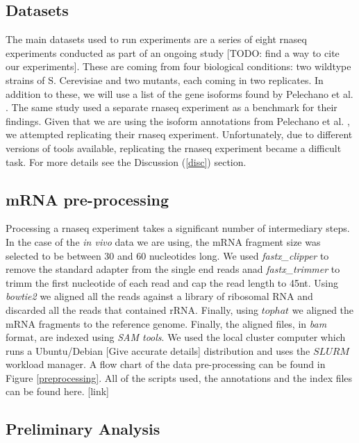 \documentclass[12pt]{article}
\begin{document}
\subsection{Datasets}\label{datasets}

The main datasets used to run experiments are a series of eight \acrshort{rnaseq} experiments conducted as part of an ongoing study {\tiny[TODO: find a way to cite our experiments]}. These are coming from four biological conditions: two wildtype strains of S. Cerevisiae and two mutants, each coming in two replicates. In addition to these, we will use a list of the gene isoforms found by Pelechano et al. \cite{Pelechano2013}. The same study \cite{Pelechano2013} used a separate \cite{Wilkening2013}  \acrshort{rnaseq} experiment as a benchmark for their findings. Given that we are using the isoform annotations from Pelechano et al. \cite{Pelechano2013}, we attempted replicating their \acrshort{rnaseq} experiment. Unfortunately, due to different versions of tools available, replicating the \acrshort{rnaseq} experiment became a difficult task. For more details see the Discussion (\ref{disc}) section. 

\subsection{mRNA pre-processing}
Processing a \acrshort{rnaseq} experiment takes a significant number of intermediary steps. In the case of the \textit{in vivo} data we are using, the mRNA fragment size was selected to be between 30 and 60 nucleotides long. We used \textit{fastx\_clipper} to remove the standard adapter from the single end reads anad \textit{fastx\_trimmer}  to trimm the first nucleotide of each read and cap the read length to 45nt. Using \textit{bowtie2} we aligned all the reads against a library of ribosomal RNA and discarded all the reads that  contained rRNA. Finally, using $tophat$ we aligned the mRNA fragments to the reference genome. Finally, the aligned files, in \textit{bam} format, are indexed using \textit{SAM tools}. We used the local cluster computer which runs a Ubuntu/Debian [Give accurate details] distribution and uses the $SLURM$ workload manager. A flow chart of the data pre-processing can be found in Figure \ref{preprocessing}. All of the scripts used, the annotations and the index files can be found here. [link]




\subsection{Preliminary Analysis}
\end{document}
